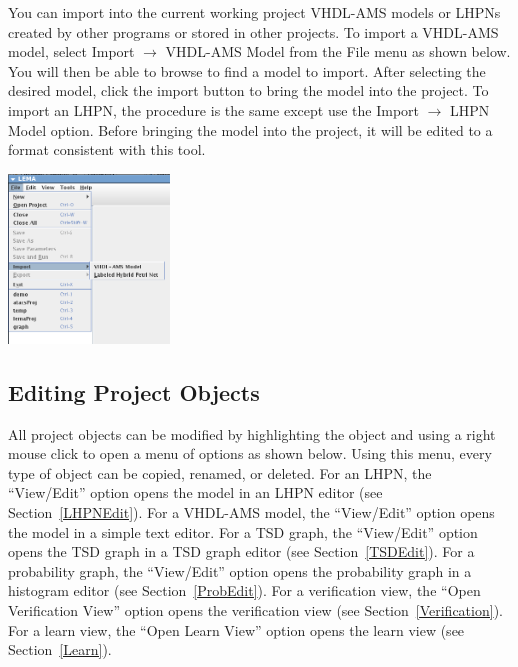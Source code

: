 \documentclass[titlepage,11pt]{article}
\begin{document}
\noindent
You can import into the current working project VHDL-AMS models
or LHPNs created by other programs or stored in other projects. 
To import a VHDL-AMS model, select Import $\rightarrow$ VHDL-AMS Model
from the File menu as shown below. You will then be able to browse to
find a model to import.  After  selecting the desired model, click the 
import button to bring the model into the project. 
To import an LHPN, the procedure is the same except use the 
Import $\rightarrow$ LHPN Model option.  Before bringing the model
into the project, it will be edited to a format consistent with this tool.  
\begin{center}
\includegraphics[height=45mm]{screenshots/importLema}
\end{center} 

\subsection{Editing Project Objects}

\noindent
All project objects can be modified by highlighting the object
and using a right mouse click to open a menu of options as shown
below. Using this menu, every type of object can be copied, renamed, or
deleted. For an LHPN, the ``View/Edit'' option opens the
model in an LHPN editor (see Section~\ref{LHPNEdit}). For a VHDL-AMS model,
the ``View/Edit'' option opens the model in a simple text editor. For a TSD
graph, the ``View/Edit'' 
option opens the TSD graph in a TSD graph editor (see Section~\ref{TSDEdit}). 
For a probability graph, the ``View/Edit'' option opens
the probability graph in a histogram editor 
(see Section~\ref{ProbEdit}). 
For a verification view, the ``Open Verification View'' option opens the
verification view (see Section~\ref{Verification}). For a learn view, the
``Open Learn View'' option opens the learn view (see Section~\ref{Learn}).
\end{document}
